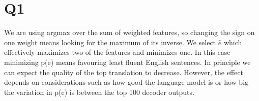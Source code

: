 \section*{Q1}

We are using argmax over the sum of weighted features, so changing the sign on one weight means looking for the maximum of its inverse. We select $\hat{e}$ which effectively maximizes two of the features and minimizes one. In this case minimizing p(e) means favouring least fluent English sentences. In principle we can expect the quality of the top translation to decrease. However, the effect depends on considerations such as how good the language model is or how big the variation in p(e) is between the top 100 decoder outputs.